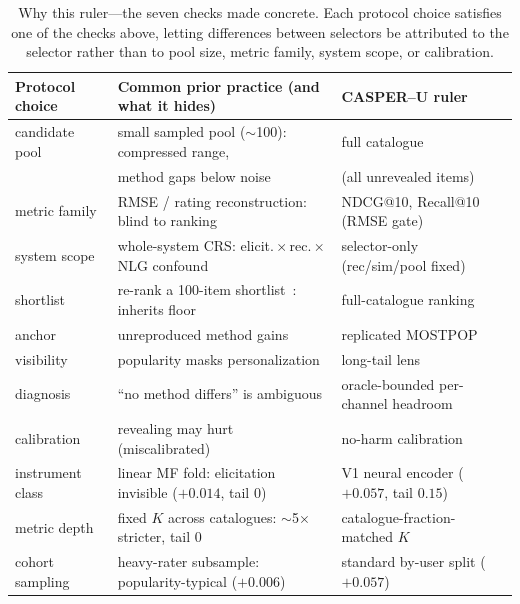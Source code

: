 \documentclass[11pt]{article}
\begin{document}
\begin{table}[h]\centering\small
\setlength{\tabcolsep}{5pt}
\begin{tabular}{lll}
\toprule
Protocol choice & Common prior practice (and what it hides) & CASPER--U ruler\\
\midrule
candidate pool & small sampled pool ($\sim$100): compressed range, & full catalogue\\
 & method gaps below noise~\cite{kr20} & (all unrevealed items)\\
metric family & RMSE / rating reconstruction: blind to ranking & NDCG@10, Recall@10 (RMSE gate)\\
system scope & whole-system CRS: elicit.\,$\times$\,rec.\,$\times$\,NLG confound & selector-only (rec/sim/pool fixed)\\
shortlist & re-rank a 100-item shortlist~\cite{pebol24}: inherits floor & full-catalogue ranking\\
anchor & unreproduced method gains & replicated MOSTPOP~\cite{dre20,sun20}\\
visibility & popularity masks personalization & long-tail lens~\cite{cremonesi10}\\
diagnosis & ``no method differs'' is ambiguous & oracle-bounded per-channel headroom\\
calibration & revealing may hurt (miscalibrated) & no-harm calibration\\
instrument class & linear MF fold: elicitation invisible ($+0.014$, tail $0$) & V1 neural encoder ($+0.057$, tail $0.15$)\\
metric depth & fixed $K$ across catalogues: $\sim$5$\times$ stricter, tail $0$ & catalogue-fraction-matched $K$\\
cohort sampling & heavy-rater subsample: popularity-typical ($+0.006$) & standard by-user split ($+0.057$)\\
\bottomrule
\end{tabular}
\caption{Why this ruler---the seven checks made concrete. Each protocol choice satisfies one of the checks above,
letting differences between selectors be attributed to the selector rather than to pool size, metric family, system
scope, or calibration.}
\label{tab:whyruler}
\end{table}
\end{document}

